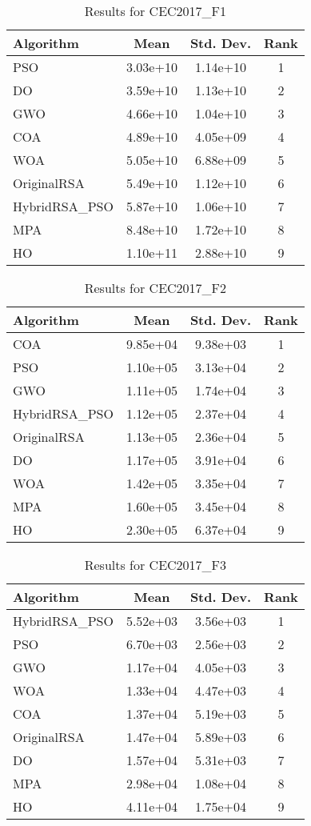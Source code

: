 \documentclass[12pt]{article}
\begin{document}
\begin{table}[H]
\centering
\caption{Results for CEC2017\_F1}
\begin{tabular}{|l|c|c|c|}
\hline
\textbf{Algorithm} & \textbf{Mean} & \textbf{Std. Dev.} & \textbf{Rank} \\
\hline
PSO & 3.03e+10 & 1.14e+10 & 1 \\
DO & 3.59e+10 & 1.13e+10 & 2 \\
GWO & 4.66e+10 & 1.04e+10 & 3 \\
COA & 4.89e+10 & 4.05e+09 & 4 \\
WOA & 5.05e+10 & 6.88e+09 & 5 \\
OriginalRSA & 5.49e+10 & 1.12e+10 & 6 \\
HybridRSA\_PSO & 5.87e+10 & 1.06e+10 & 7 \\
MPA & 8.48e+10 & 1.72e+10 & 8 \\
HO & 1.10e+11 & 2.88e+10 & 9 \\
\hline
\end{tabular}
\end{table}

\begin{table}[H]
\centering
\caption{Results for CEC2017\_F2}
\begin{tabular}{|l|c|c|c|}
\hline
\textbf{Algorithm} & \textbf{Mean} & \textbf{Std. Dev.} & \textbf{Rank} \\
\hline
COA & 9.85e+04 & 9.38e+03 & 1 \\
PSO & 1.10e+05 & 3.13e+04 & 2 \\
GWO & 1.11e+05 & 1.74e+04 & 3 \\
HybridRSA\_PSO & 1.12e+05 & 2.37e+04 & 4 \\
OriginalRSA & 1.13e+05 & 2.36e+04 & 5 \\
DO & 1.17e+05 & 3.91e+04 & 6 \\
WOA & 1.42e+05 & 3.35e+04 & 7 \\
MPA & 1.60e+05 & 3.45e+04 & 8 \\
HO & 2.30e+05 & 6.37e+04 & 9 \\
\hline
\end{tabular}
\end{table}

\begin{table}[H]
\centering
\caption{Results for CEC2017\_F3}
\begin{tabular}{|l|c|c|c|}
\hline
\textbf{Algorithm} & \textbf{Mean} & \textbf{Std. Dev.} & \textbf{Rank} \\
\hline
HybridRSA\_PSO& 5.52e+03 & 3.56e+03 & 1 \\
PSO & 6.70e+03 & 2.56e+03 & 2 \\
GWO & 1.17e+04 & 4.05e+03 & 3 \\
WOA & 1.33e+04 & 4.47e+03 & 4 \\
COA & 1.37e+04 & 5.19e+03 & 5 \\
OriginalRSA & 1.47e+04 & 5.89e+03 & 6 \\
DO & 1.57e+04 & 5.31e+03 & 7 \\
MPA & 2.98e+04 & 1.08e+04 & 8 \\
HO & 4.11e+04 & 1.75e+04 & 9 \\
\hline
\end{tabular}
\end{table}
\end{document}
